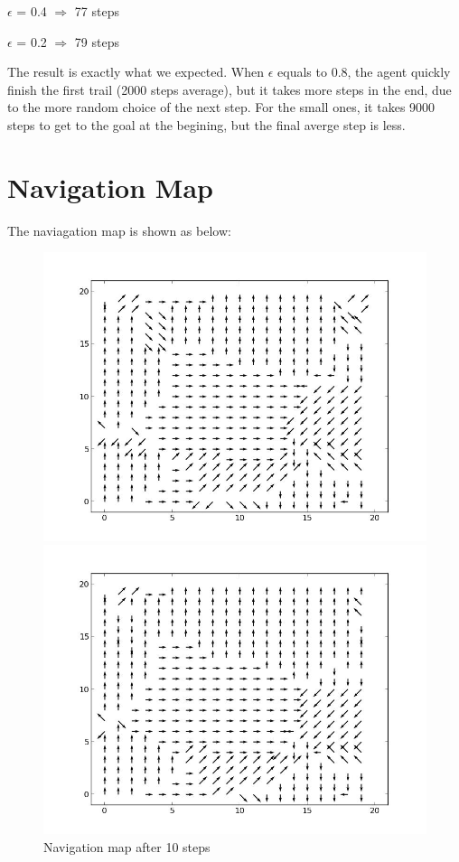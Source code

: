 \documentclass[a4paper, 12pt]{article}
\begin{document}
$\epsilon$ = 0.4 $\Rightarrow$ 77  steps

$\epsilon$ = 0.2 $\Rightarrow$ 79 steps

The result is exactly what we expected. When $\epsilon$ equals to 0.8, the agent quickly finish the first trail (2000 steps average), but it takes more steps in the end, due to the more random choice of the next step. For the small ones, it takes 9000 steps to get to the goal at the begining, but the final averge step is less.

\section{Navigation Map}


The naviagation map is shown as below:

\begin{figure}
  \centering
  \begin{minipage}[c]{0.5\textwidth}
    \centering
    \includegraphics[scale=0.3]{../figure/navMp10.jpeg}
      \caption{Navigation map after 10 steps}
  \end{minipage}%
  \begin{minipage}[c]{0.5\textwidth}
    \centering
    \includegraphics[scale=0.3]{../figure/navMp30.jpeg}

\end{minipage}
\end{figure}
\end{document}
